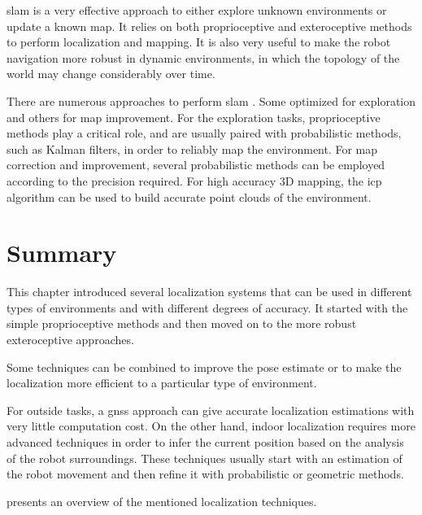 \gls{slam} \cite{Thrun2002} is a very effective approach to either explore unknown environments or update a known map. It relies on both proprioceptive and exteroceptive methods to perform localization and mapping. It is also very useful to make the robot navigation more robust in dynamic environments, in which the topology of the world may change considerably over time.

There are numerous approaches to perform  \gls{slam} \cite{Tuna2012}. Some optimized for exploration and others for map improvement. For the exploration tasks, proprioceptive methods play a critical role, and are usually paired with probabilistic methods, such as Kalman filters, in order to reliably map the environment. For map correction and improvement, several probabilistic methods can be employed according to the precision required. For high accuracy 3D mapping, the \gls{icp} algorithm can be used to build accurate point clouds of the environment.



\section{Summary}

This chapter introduced several localization systems that can be used in different types of environments and with different degrees of accuracy. It started with the simple proprioceptive methods and then moved on to the more robust exteroceptive approaches.

Some techniques can be combined to improve the pose estimate or to make the localization more efficient to a particular type of environment.

For outside tasks, a \gls{gnss} approach can give accurate localization estimations with very little computation cost. On the other hand, indoor localization requires more advanced techniques in order to infer the current position based on the analysis of the robot surroundings. These techniques usually start with an estimation of the robot movement and then refine it with probabilistic or geometric methods.

 presents an overview of the mentioned localization techniques.


